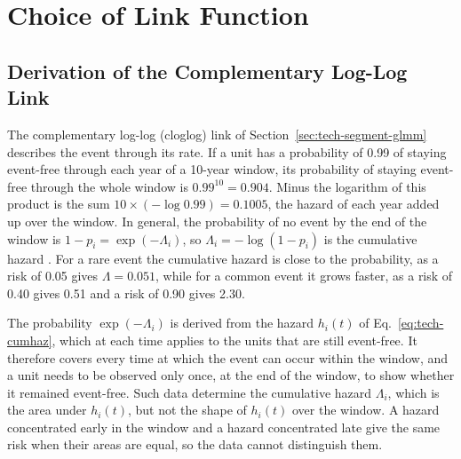 \chapter{Choice of Link Function}
\label{app:link}

\section{Derivation of the Complementary Log-Log Link}
\label{app:link-derivation}

The complementary log-log (cloglog) link of Section~\ref{sec:tech-segment-glmm} describes the event through its rate.
If a unit has a probability of 0.99 of staying event-free through each year of a 10-year window, its probability of staying event-free through the whole window is $0.99^{10} = 0.904$.
Minus the logarithm of this product is the sum $10 \times (-\log 0.99) = 0.1005$, the hazard of each year added up over the window.
In general, the probability of no event by the end of the window is $1 - p_i = \exp(-\Lambda_i)$, so $\Lambda_i = -\log(1 - p_i)$ is the cumulative hazard \cite[Section~10.2, Eq.~10.4]{dobson2002glm}.
For a rare event the cumulative hazard is close to the probability, as a risk of 0.05 gives $\Lambda = 0.051$, while for a common event it grows faster, as a risk of 0.40 gives 0.51 and a risk of 0.90 gives 2.30.

The probability $\exp(-\Lambda_i)$ is derived from the hazard $h_i(t)$ of Eq.~\eqref{eq:tech-cumhaz}, which at each time applies to the units that are still event-free.
It therefore covers every time at which the event can occur within the window, and a unit needs to be observed only once, at the end of the window, to show whether it remained event-free.
Such data determine the cumulative hazard $\Lambda_i$, which is the area under $h_i(t)$, but not the shape of $h_i(t)$ over the window.
A hazard concentrated early in the window and a hazard concentrated late give the same risk when their areas are equal, so the data cannot distinguish them.

